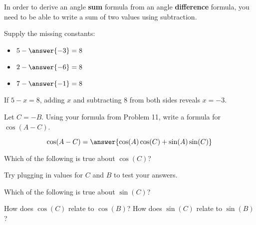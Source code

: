 \documentclass[number]{ximera}
\begin{document}

In order to derive an angle {\bf sum} formula from an angle {\bf difference} formula, you need to be able to write a sum of two values using subtraction.

\begin{problem}
Supply the missing constants:

\begin{itemize}
\item $5-\answer{-3}=8$
\item $2-\answer{-6}=8$
\item $7-\answer{-1}=8$
\end{itemize}
\begin{hint}
If $5-x=8$, adding $x$ and subtracting $8$ from both sides reveals $x=-3$.
\end{hint}

\end{problem}

\begin{problem}
Let $C=-B$. Using your formula from Problem 11, write a formula for $\cos(A-C)$.

\[\cos(A-C)=\answer{\cos(A)\cos(C)+\sin(A)\sin(C)}\]
\end{problem}

\begin{problem}
Which of the following is true about $\cos(C)$?
\begin{selectAll}
\end{selectAll}

\begin{hint}
Try plugging in values for $C$ and $B$ to test your answers.
\end{hint}

\end{problem}

\begin{problem}
Which of the following is true about $\sin(C)$?
\begin{selectAll}
\end{selectAll}
\end{problem}

\begin{question}
How does $\cos(C)$ relate to $\cos(B)$? How does $\sin(C)$ relate to $\sin(B)$?
\begin{freeResponse}

\end{freeResponse}
\end{question}
\end{document}
